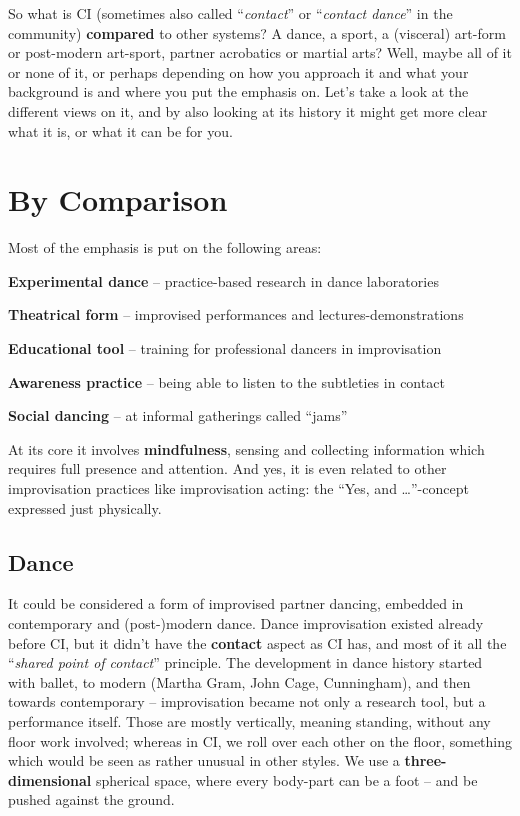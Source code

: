 So what is CI (sometimes also called ``\textit{contact}'' or ``\textit{contact dance}'' in the community) \textbf{compared} to other systems?
A dance, a sport, a (visceral) art-form or post-modern art-sport, partner acrobatics or martial arts?
Well, maybe all of it or none of it, or perhaps depending on how you approach it and what your background is and where you put the emphasis on.
Let's take a look at the different views on it, and by also looking at its history it might get more clear what it is, or what it can be for you.

\section{By Comparison}\label{sec:by-comparison}

Most of the emphasis is put on the following areas:

\begin{itemize*}
	\item [] \textbf{Experimental dance} -- practice-based research in dance laboratories
	\item [] \textbf{Theatrical form} -- improvised performances and lectures-demonstrations
	\item [] \textbf{Educational tool} -- training for professional dancers in improvisation
	\item [] \textbf{Awareness practice} -- being able to listen to the subtleties in contact
	\item [] \textbf{Social dancing} -- at informal gatherings called ``jams''
\end{itemize*}

At its core it involves \textbf{mindfulness}, sensing and collecting information which requires full presence and attention.
And yes, it is even related to other improvisation practices like improvisation acting: the ``Yes, and \ldots''-concept expressed just physically.

\subsection{Dance}\label{subsec:dance}

It could be considered a form of improvised partner dancing, embedded in contemporary and (post-)modern dance.
Dance improvisation existed already before CI, but it didn't have the \textbf{contact} aspect as CI has, and most of it all the ``\textit{shared point of contact}'' principle.
The development in dance history started with ballet, to modern (Martha Gram, John Cage, Cunningham), and then towards contemporary -- improvisation became not only a research tool, but a performance itself.
Those are mostly vertically, meaning standing, without any floor work involved; whereas in CI, we roll over each other on the floor, something which would be seen as rather unusual in other styles.
We use a \textbf{three-dimensional} spherical space, where every body-part can be a foot -- and be pushed against the ground.

